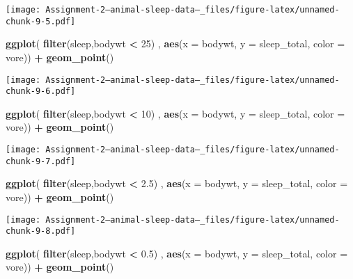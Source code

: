 \documentclass[
]{article}
\newenvironment{Shaded}{\begin{snugshade}}{\end{snugshade}}
\newcommand{\AttributeTok}[1]{\textcolor[rgb]{0.13,0.29,0.53}{#1}}
\newcommand{\DecValTok}[1]{\textcolor[rgb]{0.00,0.00,0.81}{#1}}
\newcommand{\FloatTok}[1]{\textcolor[rgb]{0.00,0.00,0.81}{#1}}
\newcommand{\FunctionTok}[1]{\textcolor[rgb]{0.13,0.29,0.53}{\textbf{#1}}}
\newcommand{\NormalTok}[1]{#1}
\newcommand{\SpecialCharTok}[1]{\textcolor[rgb]{0.81,0.36,0.00}{\textbf{#1}}}
\begin{document}
\texttt{[image: Assignment-2---animal-sleep-data--\_files/figure-latex/unnamed-chunk-9-5.pdf]}

\begin{Shaded}
\begin{Highlighting}[]
\FunctionTok{ggplot}\NormalTok{( }\FunctionTok{filter}\NormalTok{(sleep,bodywt }\SpecialCharTok{\textless{}} \DecValTok{25}\NormalTok{) , }\FunctionTok{aes}\NormalTok{(}\AttributeTok{x =}\NormalTok{ bodywt, }\AttributeTok{y =}\NormalTok{ sleep\_total, }\AttributeTok{color =}\NormalTok{ vore)) }\SpecialCharTok{+} \FunctionTok{geom\_point}\NormalTok{()}
\end{Highlighting}
\end{Shaded}

\texttt{[image: Assignment-2---animal-sleep-data--\_files/figure-latex/unnamed-chunk-9-6.pdf]}

\begin{Shaded}
\begin{Highlighting}[]
\FunctionTok{ggplot}\NormalTok{( }\FunctionTok{filter}\NormalTok{(sleep,bodywt }\SpecialCharTok{\textless{}} \DecValTok{10}\NormalTok{) , }\FunctionTok{aes}\NormalTok{(}\AttributeTok{x =}\NormalTok{ bodywt, }\AttributeTok{y =}\NormalTok{ sleep\_total, }\AttributeTok{color =}\NormalTok{ vore)) }\SpecialCharTok{+} \FunctionTok{geom\_point}\NormalTok{()}
\end{Highlighting}
\end{Shaded}

\texttt{[image: Assignment-2---animal-sleep-data--\_files/figure-latex/unnamed-chunk-9-7.pdf]}

\begin{Shaded}
\begin{Highlighting}[]
\FunctionTok{ggplot}\NormalTok{( }\FunctionTok{filter}\NormalTok{(sleep,bodywt }\SpecialCharTok{\textless{}} \FloatTok{2.5}\NormalTok{) , }\FunctionTok{aes}\NormalTok{(}\AttributeTok{x =}\NormalTok{ bodywt, }\AttributeTok{y =}\NormalTok{ sleep\_total, }\AttributeTok{color =}\NormalTok{ vore)) }\SpecialCharTok{+} \FunctionTok{geom\_point}\NormalTok{()}
\end{Highlighting}
\end{Shaded}

\texttt{[image: Assignment-2---animal-sleep-data--\_files/figure-latex/unnamed-chunk-9-8.pdf]}

\begin{Shaded}
\begin{Highlighting}[]
\FunctionTok{ggplot}\NormalTok{( }\FunctionTok{filter}\NormalTok{(sleep,bodywt }\SpecialCharTok{\textless{}} \FloatTok{0.5}\NormalTok{) , }\FunctionTok{aes}\NormalTok{(}\AttributeTok{x =}\NormalTok{ bodywt, }\AttributeTok{y =}\NormalTok{ sleep\_total, }\AttributeTok{color =}\NormalTok{ vore)) }\SpecialCharTok{+} \FunctionTok{geom\_point}\NormalTok{()}
\end{Highlighting}
\end{Shaded}
\end{document}
